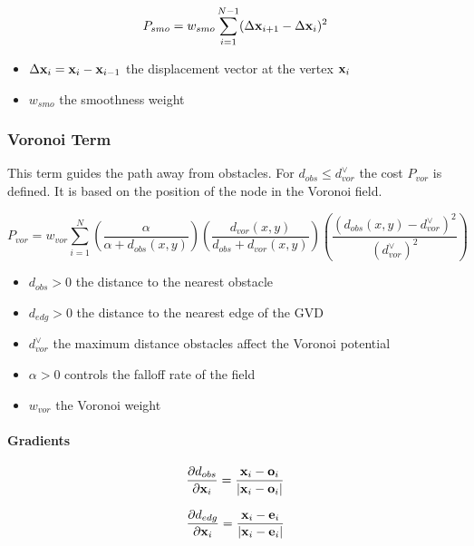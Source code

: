 \begin{equation}
P_{smo} = w_{smo} \displaystyle\sum_{i=1}^{N-1} (\Delta\mathbf{x}_{i+1} - \Delta\mathbf{x}_i)^2
\end{equation}

\begin{itemize}
\item $\Delta\mathbf{x}_i = \mathbf{x}_i - \mathbf{x}_{i-1}$ the displacement vector at the vertex $\mathbf{x}_i$
\item $w_{smo}$ the smoothness weight
\end{itemize}

\subsubsection{Voronoi Term}
This term guides the path away from obstacles. For $d_{obs} \leq d_{vor}^{\lor}$ the cost $P_{vor}$ is defined. It is based on the position of the node in the Voronoi field.

\begin{equation}
P_{vor} = w_{vor} \displaystyle\sum_{i=1}^{N} \left(\frac{\alpha}{\alpha + d_{obs}(x,y)}\right)\left(\frac{d_{vor}(x,y)}{d_{obs} + d_{vor}(x,y)}\right)\left(\frac{(d_{obs}(x,y) - d_{vor}^{\lor})^2}{(d_{vor}^{\lor})^2}\right)
\end{equation}

\begin{itemize}
\item $d_{obs} > 0$ the distance to the nearest obstacle
\item $d_{edg} > 0$ the distance to the nearest edge of the GVD
\item $d_{vor}^{\lor}$ the maximum distance obstacles affect the Voronoi potential
\item $\alpha > 0$ controls the falloff rate of the field
\item $w_{vor}$ the Voronoi weight
\end{itemize}

\paragraph{Gradients}

\begin{equation}
\frac{\partial d_{obs}}{\partial \mathbf{x}_i} = \frac{\mathbf{x}_i-\mathbf{o}_i}{|\mathbf{x}_i-\mathbf{o}_i|}
\end{equation}

\begin{equation}
\frac{\partial d_{edg}}{\partial \mathbf{x}_i} =\frac{\mathbf{x}_i-\mathbf{e}_i}{|\mathbf{x}_i-\mathbf{e}_i|}
\end{equation}

